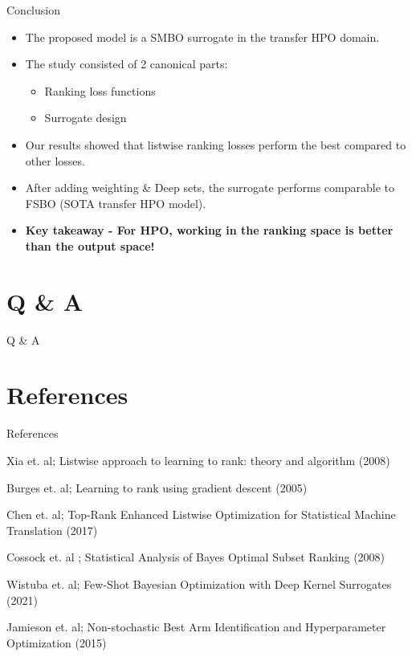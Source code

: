 \documentclass{beamer}
\begin{document}
\begin{frame}[t]{Conclusion}
\begin{itemize}
\item The proposed model is a SMBO surrogate in the transfer HPO domain.
\item The study consisted of 2 canonical parts:
\begin{itemize}
\item Ranking loss functions
\item Surrogate design
\end{itemize}
\item Our results showed that listwise ranking losses perform the best compared to other losses.
\item After adding weighting \& Deep sets,  the surrogate performs comparable to FSBO (SOTA transfer HPO model).
\item \textbf{Key takeaway - For HPO,  working in the ranking space is better than the output space!}
\end{itemize}
\end{frame}

\section{Q \& A}

\begin{frame}
\centering
\LARGE{Q \& A}
\end{frame}

\section{References}

\begin{frame}[t]{References}

\begin{thebibliography}{1}

\alert{Xia et.  al; Listwise approach to learning to rank: theory and algorithm (2008)}

\alert{Burges et.  al; Learning to rank using gradient descent (2005)}

\alert{Chen et.  al; Top-Rank Enhanced Listwise Optimization for Statistical Machine Translation (2017)}

\alert{Cossock et. al ; Statistical Analysis of Bayes Optimal Subset Ranking (2008)}

\alert{Wistuba et.  al; Few-Shot Bayesian Optimization with Deep Kernel Surrogates (2021)}

\alert{Jamieson et.  al;  Non-stochastic Best Arm Identification and Hyperparameter Optimization (2015)}

\end{thebibliography}

\end{frame}
\end{document}
